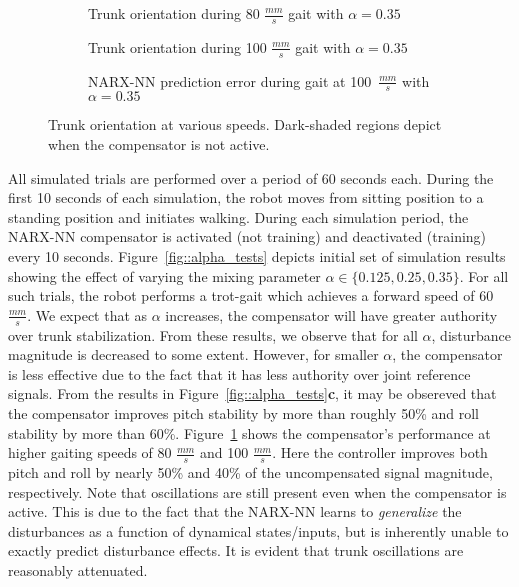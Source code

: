 \begin{figure}[b!]
	\vspace{-5mm}
	\centering
	\begin{subfigure}{0.475\textwidth}
		\centering
		\caption{Trunk orientation during 80 $\frac{mm}{s}$ gait with $\alpha = 0.35$}
	\end{subfigure}
	\begin{subfigure}{0.475\textwidth}
		\centering
		\caption{Trunk orientation during 100 $\frac{mm}{s}$ gait with $\alpha = 0.35$} 
	\end{subfigure}
	\begin{subfigure}{0.475\textwidth}
		\centering
		\caption{NARX-NN prediction error during gait at 100~$\frac{mm}{s}$ with $\alpha = 0.35$} 
	\end{subfigure}
	\caption{Trunk orientation at various speeds. Dark-shaded regions depict when the compensator is not active.}
	\label{fig::fast}
	\vspace{-3mm}
\end{figure}

All simulated trials are performed over a period of 60 seconds each. During the first 10 seconds of each simulation, the robot moves from sitting position to a standing position and initiates walking. During each simulation period, the NARX-NN compensator is activated (not training)  and deactivated (training)  every 10 seconds. Figure~\ref{fig::alpha_tests} depicts initial set of simulation results showing the effect of varying the mixing parameter $\alpha\in\{0.125, 0.25, 0.35\}$. For all such trials, the robot performs a trot-gait which achieves a forward speed of 60 $\frac{mm}{s}$. We expect that as $\alpha$ increases, the compensator will have greater authority over trunk stabilization. From these results, we observe that for all $\alpha$, disturbance magnitude is decreased to some extent. However, for smaller $\alpha$, the compensator is less effective due to the fact that it has less authority over joint reference signals.  From the results in Figure~\ref{fig::alpha_tests}\textbf{c}, it may be obsereved that the compensator improves pitch stability by more than roughly 50\% and roll stability by more than 60\%. Figure~\ref{fig::fast} shows the compensator's performance at higher gaiting speeds of 80 $\frac{mm}{s}$ and 100 $\frac{mm}{s}$. Here the controller improves both pitch and roll by nearly 50\% and 40\% of the  uncompensated signal magnitude, respectively. Note that oscillations are still present even when the compensator is active. This is due to the fact that the NARX-NN learns to \emph{generalize} the disturbances as a function of dynamical states/inputs, but is inherently unable to exactly predict disturbance effects. It is evident that trunk oscillations are reasonably attenuated.

